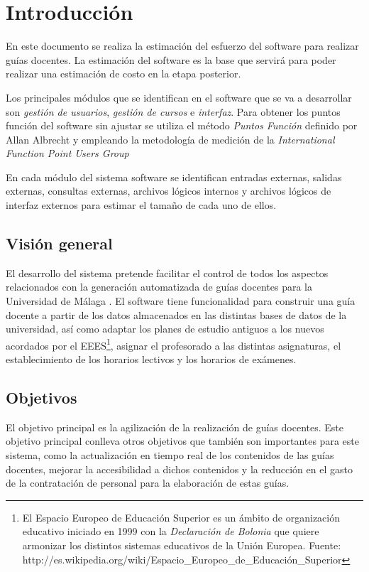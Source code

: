 \documentclass[11pt,a4paper,spanish,twoside]{book}
\begin{document}
\tableofcontents
\listoftables

\chapter*{Introducción}
En este documento se realiza la estimación del esfuerzo del software para
realizar guías docentes. La estimación del software es la base que servirá
para poder realizar una estimación de costo en la etapa posterior.

Los principales módulos que se identifican en el software que se
va a desarrollar son \emph{gestión de usuarios}, \emph{gestión de cursos} e
\emph{interfaz}. Para obtener los puntos función del software sin ajustar se
utiliza el método \emph{Puntos Función} definido por Allan Albrecht
\cite{albrecht} y empleando la metodología de medición de la
\emph{International Function Point Users Group}

En cada módulo del sistema software se identifican entradas externas, salidas
externas, consultas externas, archivos lógicos internos y archivos lógicos de
interfaz externos para estimar el tamaño de cada uno de ellos.

\section*{Visión general}
El desarrollo del sistema pretende facilitar el control de todos los aspectos
relacionados con la generación automatizada de guías docentes para la
Universidad de Málaga \cite{uma}. El software tiene funcionalidad para
construir una 
guía docente a partir de los datos almacenados en las distintas bases de
datos de la universidad, así como adaptar los planes de estudio antiguos a
los nuevos acordados por el EEES\footnote{El Espacio Europeo de Educación
  Superior es un ámbito de organización educativo iniciado en 1999 con la
  \emph{Declaración de Bolonia} que quiere armonizar los distintos sistemas
  educativos de la Unión Europea. Fuente:
  http://es.wikipedia.org/wiki/Espacio\_Europeo\_de\_Educación\_Superior},
asignar el profesorado a las distintas asignaturas, el establecimiento de los
horarios lectivos y los horarios de exámenes.

\section*{Objetivos}
El objetivo principal es la agilización de la realización de guías
docentes. Este objetivo principal conlleva otros objetivos que también son
importantes para este sistema, como la actualización en tiempo real de los
contenidos de las guías docentes, mejorar la accesibilidad a dichos
contenidos y la reducción en el gasto de la contratación de personal para la
elaboración de estas guías.
\end{document}
